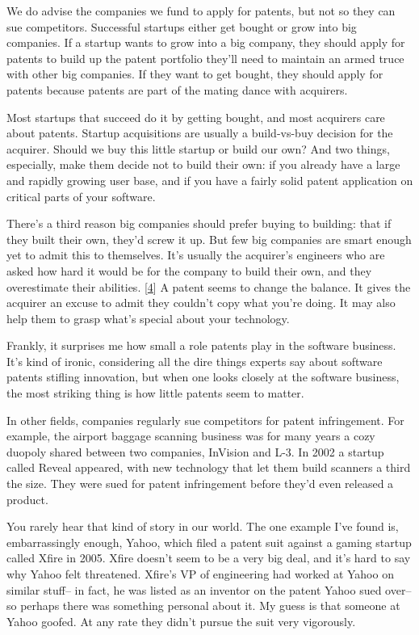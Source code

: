 We do advise the companies we fund to apply for patents, but not so they
can sue competitors. Successful startups either get bought or grow into
big companies. If a startup wants to grow into a big company, they
should apply for patents to build up the patent portfolio they'll need
to maintain an armed truce with other big companies. If they want to get
bought, they should apply for patents because patents are part of the
mating dance with acquirers.

Most startups that succeed do it by getting bought, and most acquirers
care about patents. Startup acquisitions are usually a build-vs-buy
decision for the acquirer. Should we buy this little startup or build
our own? And two things, especially, make them decide not to build their
own: if you already have a large and rapidly growing user base, and if
you have a fairly solid patent application on critical parts of your
software.

There's a third reason big companies should prefer buying to building:
that if they built their own, they'd screw it up. But few big companies
are smart enough yet to admit this to themselves. It's usually the
acquirer's engineers who are asked how hard it would be for the company
to build their own, and they overestimate their abilities.
{[}\hyperref[f4n]{4}{]} A patent seems to change the balance. It gives
the acquirer an excuse to admit they couldn't copy what you're doing. It
may also help them to grasp what's special about your technology.

Frankly, it surprises me how small a role patents play in the software
business. It's kind of ironic, considering all the dire things experts
say about software patents stifling innovation, but when one looks
closely at the software business, the most striking thing is how little
patents seem to matter.

In other fields, companies regularly sue competitors for patent
infringement. For example, the airport baggage scanning business was for
many years a cozy duopoly shared between two companies, InVision and
L-3. In 2002 a startup called Reveal appeared, with new technology that
let them build scanners a third the size. They were sued for patent
infringement before they'd even released a product.

You rarely hear that kind of story in our world. The one example I've
found is, embarrassingly enough, Yahoo, which filed a patent suit
against a gaming startup called Xfire in 2005. Xfire doesn't seem to be
a very big deal, and it's hard to say why Yahoo felt threatened. Xfire's
VP of engineering had worked at Yahoo on similar stuff-- in fact, he was
listed as an inventor on the patent Yahoo sued over-- so perhaps there
was something personal about it. My guess is that someone at Yahoo
goofed. At any rate they didn't pursue the suit very vigorously.

